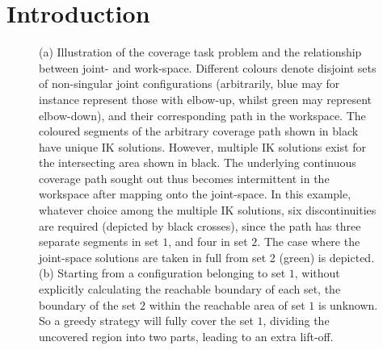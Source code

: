 \documentclass[journal]{IEEEtran}
\begin{document}
\section{Introduction}

\begin{figure}[t]
\centering
{}
\caption{(a) Illustration of the coverage task problem and the relationship between joint- and work-space. 
Different colours denote disjoint sets of non-singular 
joint configurations (arbitrarily, blue may for instance represent those with 
elbow-up, whilst green may represent elbow-down), and their corresponding path in the workspace. 
The coloured segments of the arbitrary coverage path shown in black have unique IK solutions. However, multiple IK solutions exist for the intersecting area shown in black.
The underlying continuous coverage path sought out thus becomes intermittent in the workspace after mapping onto the joint-space.
In this example, whatever choice among the multiple IK solutions, six discontinuities are required 
(depicted by black crosses), since the path has three separate segments in set $1$, and four in set $2$. 
The case where the joint-space solutions are taken in full from set 2 (green) is depicted.
(b) Starting from a configuration belonging to set $1$, without explicitly calculating the reachable boundary of each set, the boundary of the set $2$ within the reachable area of set $1$ is unknown. So a greedy strategy will fully cover the set $1$, dividing the uncovered region into two parts, leading to an extra lift-off. 
}
\end{figure}
\end{document}
